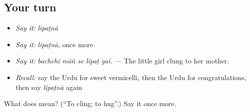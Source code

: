 \subsection*{Your turn}
\begin{itemize}
\raggedright
  \item \emph{Say it:} \emph{lipaṭnā}
  \item \emph{Say it:} \emph{lipaṭnā}, once more
  \item \emph{Say it:} \emph{bachchī māṅ se lipaṭ gaī.} — The little girl clung to her mother.
  \item \emph{Recall:} say the Urdu for sweet vermicelli, then the Urdu for congratulations, then say \emph{lipaṭnā} again
\end{itemize}

\begin{tcolorbox}[breakable,colback=teal!4,colframe=teal!35!black,title={Before you move on}]
What does  mean? (\textquotedblleft{}To cling; to hug\textquotedblright{}.) Say it once more.
\end{tcolorbox}
